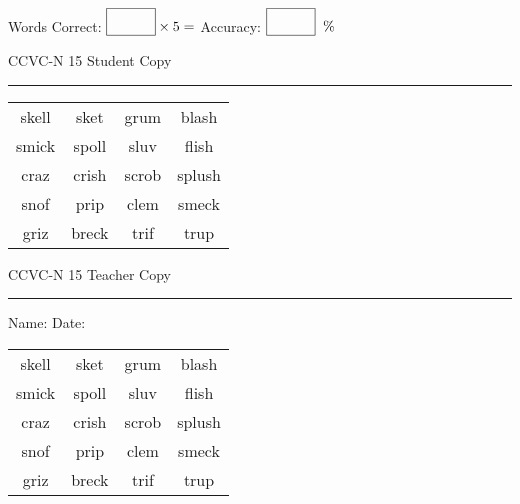 \documentclass{memoir}
\begin{document}
\small

Words Correct: $\fbox{\phantom{\huge 100}} \times 5 = $ Accuracy: $\fbox{\phantom{\huge 100}}\;\; \%$ 

\vfill

\newpage


\footnotesize \noindent
CCVC-N 15 \hfill Student Copy
\smallskip
\hrule

\Large

\setlength{\tabcolsep}{14pt}
\def\arraystretch{3}

{\selectfont


\begin{vplace}[0.5]
\begin{center}
\begin{tabular}{cccc}
skell & sket & grum       & blash \\
smick & spoll & sluv & flish             \\
craz       & crish & scrob & splush \\
snof & prip & clem & smeck \\
griz & breck       & trif & trup       \\
\end{tabular}
\end{center}
\end{vplace}

}

\newpage

\footnotesize \noindent
CCVC-N 15 \hfill Teacher Copy
\smallskip
\hrule

\small

\vfill

\noindent
Name: \underline{\hspace{1.75in}} \hfill Date: \underline{\hspace{1in}}

\Large

{\selectfont


\begin{vplace}[0.5]
\begin{center}
\begin{tabular}{cccc}
skell & sket & grum       & blash \\
smick & spoll & sluv & flish             \\
craz       & crish & scrob & splush \\
snof & prip & clem & smeck \\
griz & breck       & trif & trup       \\
\end{tabular}
\end{center}
\end{vplace}



}
\end{document}
